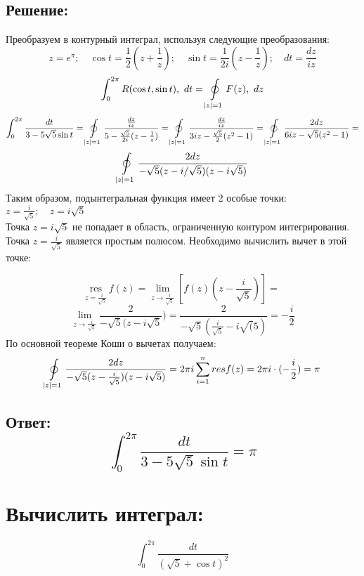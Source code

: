 \documentclass{article}
\begin{document}
	\subsection{Решение:}
	Преобразуем в контурный интеграл, используя следующие преобразования:
	\[
		z = e^{\pi}; \quad \cos{t}= \frac{1}{2}\left( z + \frac{1}{z}\right); \quad \sin
		{t}= \frac{1}{2i}\left( z - \frac{1}{z}\right); \quad dt = \frac{dz}{iz}
	\]
	\[
		\int_{0}^{2\pi}R(\cos{t}, \sin{t}) ,\ dt = \ointop_{|z| = 1}F(z) ,\ dz
	\]
	\[
		\int_{0}^{2\pi}\frac{dt}{3 - 5\sqrt{5}\sin{t}}= \ointop_{|z| = 1}\frac{\frac{dz}{iz}}{5
		-\frac{\sqrt{5}}{2i}(z - \frac{1}{z})}= \ointop_{|z| = 1}\frac{\frac{dz}{iz}}{3iz
		-\frac{\sqrt{5}}{2}(z^{2}- 1)}= \ointop_{|z| = 1}\frac{2dz}{6iz -\sqrt{5}(z^{2}-
		1)}=
	\]
	\[
		\ointop_{|z| = 1}\frac{2dz}{-\sqrt{5}(z - i/\sqrt{5})(z - i\sqrt{5})}
	\]
	Таким образом, подынтегральная функция имеет 2 особые точки:
	$z = \frac{i}{\sqrt{5}}; \quad z = i\sqrt{5}$ \\ Точка $z = i\sqrt{5}$ не
	попадает в область, ограниченную контуром интегрирования. \\ Точка
	$z = \frac{i}{\sqrt{5}}$ является простым полюсом. Необходимо вычислить вычет в
	этой точке:

	\[
		\underset{z = \frac{i}{\sqrt{5}}}{\text{res}}\ f(z) = \lim\limits_{z\rightarrow
		\frac{i}{\sqrt{5}}}\left[ f(z)(z -\frac{i}{\sqrt{5}})\right] =
	\]
	\[
		\lim\limits_{z\rightarrow \frac{i}{\sqrt{5}}}\frac{2}{-\sqrt{5}(z - i\sqrt{5}}
		) = \frac{2}{-\sqrt{5}(\frac{i}{\sqrt{5}} -i\sqrt{(}5)}= -\frac{i}{2}
	\]
	По основной теореме Коши о вычетах получаем:
	\[
		\ointop_{|z| = 1}\frac{2dz}{-\sqrt{5}(z -\frac{i}{\sqrt{5}}) (z - i\sqrt{5})}
		= 2\pi i \sum\limits_{i = 1}^{n}resf(z) = 2\pi i \cdot (-\frac{i}{2}) = \pi
	\]
	\subsection{Ответ:
	\[
		\int_{0}^{2\pi}\frac{dt}{3 - 5\sqrt{5}\sin{t}}= \pi
	\]
	}

	\section{Вычислить интеграл: }
	\[
		\int_{0}^{2\pi}\frac{dt}{(\sqrt{5}+ \cos{t})^{2}}
	\]
\end{document}
